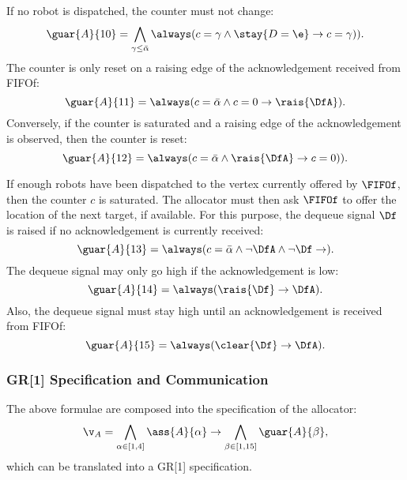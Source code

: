 If no robot is dispatched, the counter must not change:
\begin{equation*}
    \guar{A}{10} = \bigwedge_{\gamma \leq \bar{\alpha}} \always(c=\gamma \wedge \stay{D=\e} \rightarrow \next(c=\gamma)).
\end{equation*}
The counter is only reset on a raising edge of the acknowledgement received from FIFOf:
\begin{equation*}
    \guar{A}{11} = \always(c=\bar{\alpha} \wedge c=0 \rightarrow \rais{\DfA}).
\end{equation*}
Conversely, if the counter is saturated and a raising edge of the acknowledgement is observed, then the counter is reset:
\begin{equation*}
    \guar{A}{12} = \always(c=\bar{\alpha} \wedge \rais{\DfA} \rightarrow \next(c=0)).
\end{equation*}

If enough robots have been dispatched to the vertex currently offered by $\FIFOf$, then the counter $c$ is saturated. The allocator must then ask $\FIFOf$ to offer the location of the next target, if available. For this purpose, the dequeue signal $\Df$ is raised if no acknowledgement is currently received:
\begin{equation*}
    \guar{A}{13} = \always(c=\bar{\alpha} \wedge \neg\DfA \wedge \neg\Df \rightarrow \next\Df).
\end{equation*}
The dequeue signal may only go high if the acknowledgement is low:
\begin{equation*}
    \guar{A}{14} = \always(\rais{\Df} \rightarrow \next\neg\DfA).
\end{equation*}
Also, the dequeue signal must stay high until an acknowledgement is received from FIFOf:
\begin{equation*}
    \guar{A}{15} = \always(\clear{\Df} \rightarrow \DfA).
\end{equation*}


\subsubsection{GR[1] Specification and Communication}  

The above formulae are composed into the specification of the allocator:
\begin{equation*}
    \v_A = \bigwedge_{\alpha \in [1, 4]} \ass{A}{\alpha} \rightarrow \bigwedge_{\beta \in [1, 15]} \guar{A}{\beta},
\end{equation*}
which can be translated into a GR[1] specification.\\

